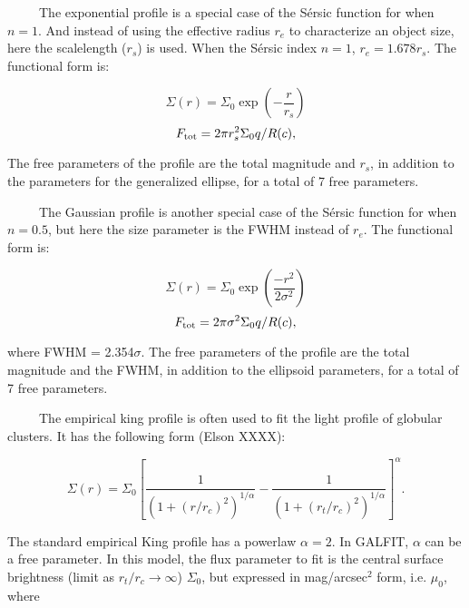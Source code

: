 \documentclass[preprint]{aastex}
\begin{document}
\bigskip

\ \ \ \ \ The exponential profile is a
special case of the S\'ersic function for when $n=1$.  And instead of using
the effective radius $r_e$ to characterize an object size, here the
scalelength ($r_s$) is used.  When the S\'ersic index $n=1$, $r_e = 1.678
r_s$.  The functional form is:

\begin {equation}
\Sigma(r)=\Sigma_0 \exp{\left(-\frac{r}{r_s}\right)}
\end{equation}
\begin{equation}
F_{\rm tot} = 2\pi r_s^2 \Sigma_0 q/R(c),
\end {equation}

\noindent The free parameters of the profile are the total magnitude and
$r_s$, in addition to the parameters for the generalized ellipse,
for a total of 7 free parameters.

\bigskip

\ \ \ \ \ The Gaussian profile is another
special case of the S\'ersic function for when $n=0.5$, but here the size
parameter is the FWHM instead of $r_e$.  The functional form is:

\begin{equation}
\Sigma(r) = \Sigma_0 \exp{\left(\frac{-r^2} {2 \sigma^2}\right)}
\end{equation}
\begin{equation}
F_{\rm tot} = 2\pi\sigma^2\Sigma_0 q/R(c),
\end {equation}

\noindent where FWHM = 2.354$\sigma$.  The free parameters of the profile are
the total magnitude and the FWHM, in addition to the ellipsoid parameters, for
a total of 7 free parameters.

\bigskip

\ \ \ \ \ The empirical
king profile is often used to fit the light profile of globular clusters.  It
has the following form (Elson XXXX):

\begin{equation}
\Sigma(r) = \Sigma_0 \left[\frac{1}{(1+(r/r_c)^2)^{1/\alpha}} - \frac{1}{(1+(r_t/r_c)^2)^{1/\alpha}} \right]^\alpha.
\end{equation}

\noindent The standard empirical King profile has a powerlaw $\alpha= 2$.  In
GALFIT, $\alpha$ can be a free parameter.  In this model, the flux parameter
to fit is the central surface brightness (limit as $r_t/r_c
\rightarrow\infty$) $\Sigma_0$, but expressed in mag/arcsec$^2$ form, i.e.
$\mu_0$, where
\end{document}
